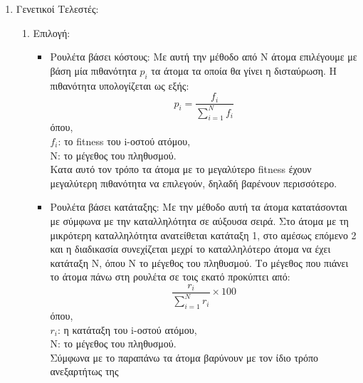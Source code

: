 \documentclass[12pt,a4paper]{article}
\newcommand{\tl}{\textlatin}
\begin{document}
\begin{enumerate}
                \item Γενετικοί Τελεστές:
                    \begin{enumerate}
                        \item Επιλογή:
                        \begin{itemize}
                                \item Ρουλέτα βάσει κόστους: Με αυτή την μέθοδο από Ν 
                                    άτομα επιλέγουμε με βάση μία 
                                    πιθανότητα \tl{$p_i$} τα άτομα τα οποία θα γίνει η δισταύρωση. Η 
                                    πιθανότητα υπολογίζεται ως εξής: 
                                    $$ p_i = \frac{f_i}{\sum_{i=1}^{N}f_i}$$
                                     όπου, \\ $f_i$: το \tl{fitness} του \tl{i}-οστού ατόμου,\\
                                    Ν: το μέγεθος του πληθυσμού.
                                    \\ Κατα αυτό τον τρόπο τα άτομα με το μεγαλύτερο \tl{fitness} 
                                    έχουν μεγαλύτερη πιθανότητα να επιλεγούν, δηλαδή βαρένουν περισσότερο.
                                    \item  Ρουλέτα βάσει κατάταξης: Με την μέθοδο αυτή τα 
                                        άτομα κατατάσονται με
                                        σύμφωνα με την καταλληλότητα σε αύξουσα σειρά. Στο 
                                        άτομα με τη μικρότερη 
                                        καταλληλότητα ανατείθεται κατάταξη 1, στο αμέσως επόμενο 2
                                        και η διαδικασία συνεχίζεται μεχρί το
                                        καταλληλότερο άτομα να έχει κατάταξη Ν, όπου 
                                        Ν το μέγεθος του πληθυσμού.
                                        Το μέγεθος που πιάνει το άτομα πάνω στη ρουλέτα σε 
                                        τοις εκατό προκύπτει από:
                                        $$\frac{r_i}{\sum_{i=1}^{N}r_i}\times100$$
                                        όπου,
                                        \\ $r_i$: η κατάταξη του \tl{i}-οστού ατόμου,\\ 
                                        Ν: το μέγεθος του πληθυσμού.
                                        \\ Σύμφωνα με το παραπάνω τα άτομα βαρύνουν με 
                                        τον ίδιο τρόπο ανεξαρτήτως της

\end{itemize}
\end{enumerate}
\end{enumerate}
\end{document}
